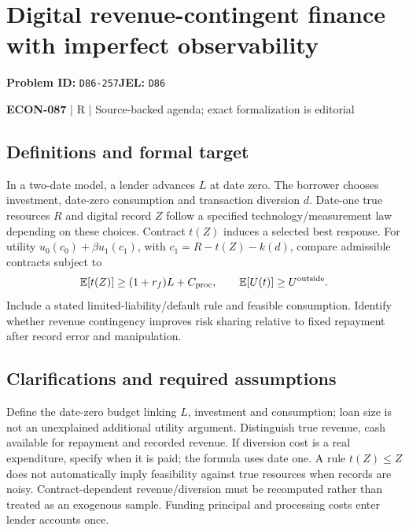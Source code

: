 \documentclass[11pt,a4paper]{article}
\begin{document}
\section*{Digital revenue-contingent finance with imperfect observability}
\textbf{Problem ID:} \texttt{D86-257}\quad \textbf{JEL:} \texttt{D86}\par
\label{problem:OP-0648}


\label{audited:ECON-087}

{\sffamily\small\color{muted}\textbf{ECON-087} | R | Source-backed agenda; exact formalization is editorial\par}

\subsection*{Definitions and formal target}

In a two-date model, a lender advances \(L\) at date zero. The borrower chooses investment, date-zero consumption and transaction diversion \(d\). Date-one true resources \(R\) and digital record \(Z\) follow a specified technology/measurement law depending on these choices. Contract \(t(Z)\) induces a selected best response. For utility \(u_0(c_0)+\beta u_1(c_1)\), with \(c_1=R-t(Z)-k(d)\), compare admissible contracts subject to
\[
 \mathbb E[t(Z)]\geq(1+r_f)L+C_{\rm proc},\qquad
 \mathbb E[U(t)]\geq U^{\rm outside}.
\]
Include a stated limited-liability/default rule and feasible consumption. Identify whether revenue contingency improves risk sharing relative to fixed repayment after record error and manipulation.

\subsection*{Clarifications and required assumptions}

Define the date-zero budget linking \(L\), investment and consumption; loan size is not an unexplained additional utility argument. Distinguish true revenue, cash available for repayment and recorded revenue. If diversion cost is a real expenditure, specify when it is paid; the formula uses date one. A rule \(t(Z)\leq Z\) does not automatically imply feasibility against true resources when records are noisy. Contract-dependent revenue/diversion must be recomputed rather than treated as an exogenous sample. Funding principal and processing costs enter lender accounts once.
\end{document}

